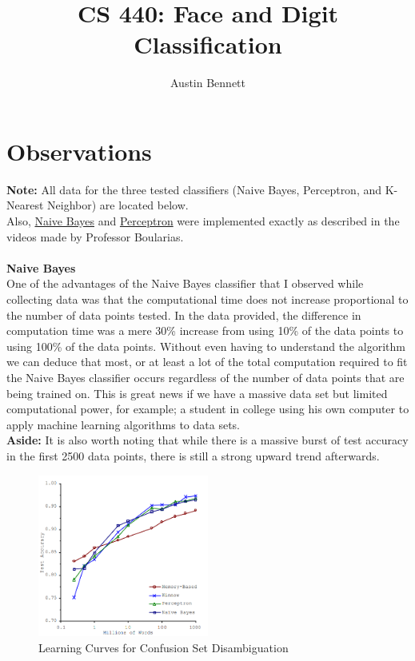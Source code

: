 \documentclass[12pt]{article}
\newcommand\tab[1][1cm]{\hspace*{#1}}
\begin{document}
\title{CS 440: Face and Digit Classification}
\author{Austin Bennett}
\maketitle


\section*{Observations}
\textbf{Note:} All data for the three tested classifiers (Naive Bayes, Perceptron, and K-Nearest Neighbor) are located below. \\
Also, \href{https://www.youtube.com/watch?v=YVwT--QiZGA}{Naive Bayes} and \href{https://www.youtube.com/watch?v=R2XgpDQro9k}{Perceptron}  were implemented exactly as described in the videos made by Professor Boularias.\\ \\
\textbf{Naive Bayes} \\
\tab One of the advantages of the Naive Bayes classifier that I observed while collecting data was that the computational time does not increase proportional to the number of data points tested. In the data provided, the difference in computation time was a mere 30\% increase from using 10\% of the data points to using 100\% of the data points. Without even having to understand the algorithm we can deduce that most, or at least a lot of the total computation required to fit the Naive Bayes classifier occurs regardless of the number of data points that are being trained on. This is great news if we have a massive data set but limited computational power, for example; a student in college using his own computer to apply machine learning algorithms to data sets. \\
\tab \textbf{Aside:} It is also worth noting that while there is a massive burst of test accuracy in the first 2500 data points, there is still a strong upward trend afterwards.
\begin{figure}[!htb]
	\centering
	\includegraphics[width=0.5\textwidth]{unreasonable_effectiveness_of_data.png}
	\caption{Learning Curves for Confusion Set Disambiguation}
\end{figure} \\
\end{document}
